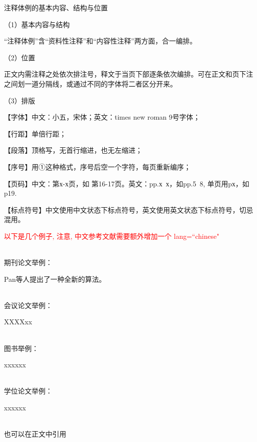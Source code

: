 注释体例的基本内容、结构与位置

（1）基本内容与结构

“注释体例”含“资料性注释”和“内容性注释”两方面，合一编排。

（2）位置

正文内需注释之处依次排注号，释文于当页下部逐条依次编排。可在正文和页下注之间划一道分隔线，或通过不同的字体将二者区分开来。

（3）排版

【字体】中文：小五，宋体；英文：times new roman 9号字体；

【行距】单倍行距；

【段落】顶格写，无首行缩进，也无左缩进；

【序号】用①这种格式，序号后空一个字符，每页重新编序；

【页码】中文：第х-х页，如 第16-17页。英文：pp.х~х，如pp.5~8, 单页用pх，如p19.

【标点符号】中文使用中文状态下标点符号，英文使用英文状态下标点符号，切忌混用。

\textcolor{red}{以下是几个例子, 注意, 中文参考文献需要额外增加一个 lang=``chinese"}


~\\
期刊论文举例：

Pan等人提出了一种全新的算法\cite{pan2018classification, pan2014cell, song2013asynchronous, lin2022adaptive}。

~\\
会议论文举例：

XXXXxx\cite{li2021large}

~\\
图书举例：

xxxxxx\cite{shavlik1990readings, yan2006CFG}

~\\
学位论文举例：

xxxxxx\cite{jxd1996, CCPT}

~\\
也可以在正文中引用




